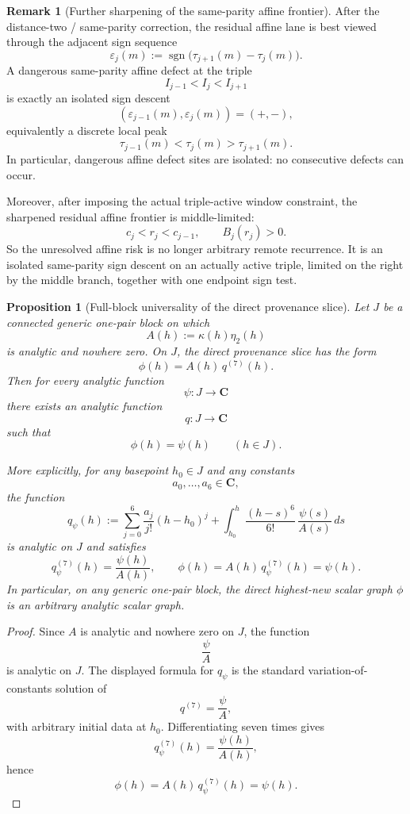 \documentclass[11pt,a4paper]{amsart}
\theoremstyle{plain}
\newtheorem{proposition}[theorem]{Proposition}
\theoremstyle{definition}
\newtheorem{remark}[theorem]{Remark}
\newcommand{\sgn}{\operatorname{sgn}}
\begin{document}
\begin{remark}[Further sharpening of the same-parity affine frontier]
\label{rem:further-sharpening-same-parity-affine-frontier}
After the distance-two / same-parity correction, the residual affine lane is
best viewed through the adjacent sign sequence
\[
\varepsilon_j(m):=\sgn\!\bigl(\tau_{j+1}(m)-\tau_j(m)\bigr).
\]
A dangerous same-parity affine defect at the triple
\[
I_{j-1}<I_j<I_{j+1}
\]
is exactly an isolated sign descent
\[
(\varepsilon_{j-1}(m),\varepsilon_j(m))=(+,-),
\]
equivalently a discrete local peak
\[
\tau_{j-1}(m)<\tau_j(m)>\tau_{j+1}(m).
\]
In particular, dangerous affine defect sites are isolated: no consecutive
defects can occur.

Moreover, after imposing the actual triple-active window constraint, the
sharpened residual affine frontier is middle-limited:
\[
c_j<r_j<c_{j-1},
\qquad
B_j(r_j)>0.
\]
So the unresolved affine risk is no longer arbitrary remote recurrence. It is an
isolated same-parity sign descent on an actually active triple, limited on the
right by the middle branch, together with one endpoint sign test.
\end{remark}

\begin{proposition}[Full-block universality of the direct provenance slice]
\label{prop:full-block-universality-direct-provenance-slice}
Let $J$ be a connected generic one-pair block on which
\[
A(h):=\kappa(h)\eta_2(h)
\]
is analytic and nowhere zero. On $J$, the direct provenance slice has the form
\[
\phi(h)=A(h)\,q^{(7)}(h).
\]
Then for every analytic function
\[
\psi:J\to\mathbf C
\]
there exists an analytic function
\[
q:J\to\mathbf C
\]
such that
\[
\phi(h)=\psi(h)
\qquad (h\in J).
\]

More explicitly, for any basepoint $h_0\in J$ and any constants
\[
a_0,\dots,a_6\in\mathbf C,
\]
the function
\[
q_\psi(h)
:=
\sum_{j=0}^6 \frac{a_j}{j!}(h-h_0)^j
+
\int_{h_0}^h \frac{(h-s)^6}{6!}\,\frac{\psi(s)}{A(s)}\,ds
\]
is analytic on $J$ and satisfies
\[
q_\psi^{(7)}(h)=\frac{\psi(h)}{A(h)},
\qquad
\phi(h)=A(h)\,q_\psi^{(7)}(h)=\psi(h).
\]
In particular, on any generic one-pair block, the direct highest-new scalar
graph $\phi$ is an arbitrary analytic scalar graph.
\end{proposition}

\begin{proof}
Since $A$ is analytic and nowhere zero on $J$, the function
\[
\frac{\psi}{A}
\]
is analytic on $J$. The displayed formula for $q_\psi$ is the standard
variation-of-constants solution of
\[
q^{(7)}=\frac{\psi}{A},
\]
with arbitrary initial data at $h_0$. Differentiating seven times gives
\[
q_\psi^{(7)}(h)=\frac{\psi(h)}{A(h)},
\]
hence
\[
\phi(h)=A(h)\,q_\psi^{(7)}(h)=\psi(h).
\]
\end{proof}
\end{document}
